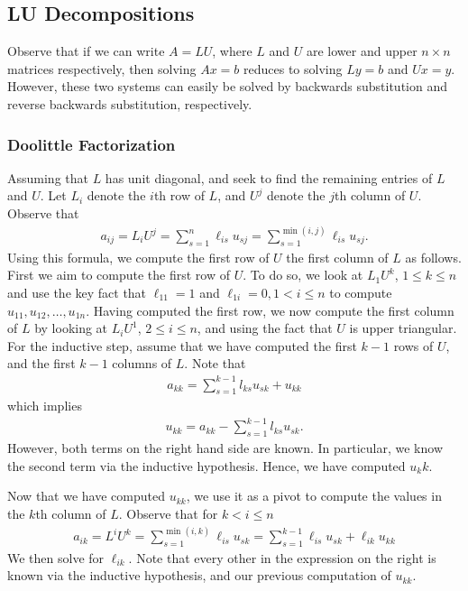 \documentclass[12pt]{article}
\theoremstyle{plain}
\theoremstyle{definition}
\theoremstyle{remark}
\numberwithin{equation}{section}  %
\begin{document}
\subsection{LU Decompositions} 
Observe that if we can write $A = LU$, where
$L$ and $U$ are lower and upper $n \times n$ matrices respectively,
then solving $Ax = b$ reduces to solving $Ly = b$ and $Ux = y$.
However, these two systems can easily be solved by backwards substitution
and reverse backwards substitution, respectively.

\subsubsection*{Doolittle Factorization}
Assuming that $L$ has unit diagonal, and seek to find the remaining
entries of $L$ and $U$. Let $L_i$ denote the $i$th row of $L$,
and $U^j$ denote the $j$th column of $U$. Observe that
\begin{align*}
a_{ij} = L_i U^j = \sum_{s=1}^n \ell_{is} u_{sj} = \sum_{s=1}^{\min(i,j)} \ell_{is} u_{sj}.
\end{align*}
Using this formula, we compute the first row of $U$ 
the first column of $L$ as follows. First we aim to compute the first row of $U$.
To do so, we look at $L_1 U^k$, $1 \le k \le n$ and
use the key fact that $\ell_{11} = 1$ and $\ell_{1i} = 0, 1 < i \le n$
to compute $u_{11}, u_{12}, \ldots, u_{1n}$. 
Having computed the first row, we now compute the first column of $L$
by looking at $L_i U^1$, $2 \le i \le n$, and using the fact that
$U$ is upper triangular. 
For the inductive step, assume that we have computed the first $k-1$ rows
of $U$, and the first $k-1$ columns of $L$. Note that
\begin{align*}
a_{kk} = \sum_{s=1}^{k-1}l_{ks}u_{sk} + u_{kk}
\end{align*}
which implies
\begin{align*}
u_{kk} = a_{kk} - \sum_{s=1}^{k-1}l_{ks}u_{sk}.
\end{align*}
However, both terms on the right hand side are known. In particular,
we know the second term via the inductive hypothesis. Hence,
we have computed $u_kk$.

Now that we have computed $u_{kk}$, we use it as a pivot to compute
the values in the $k$th column of $L$. 
Observe that for $k < i \le n$
\begin{align*}
a_{ik} = L^i U^k = \sum_{s=1}^{\min(i,k)}\ell_{is}u_{sk}
= \sum_{s=1}^{k-1} \ell_{is} u_{sk} + \ell_{ik} u_{kk}
\end{align*}
We then solve for $\ell_{ik}$. Note that every other in the expression
on the right is known via the inductive hypothesis, and our previous
computation of $u_{kk}$.
\end{document}
